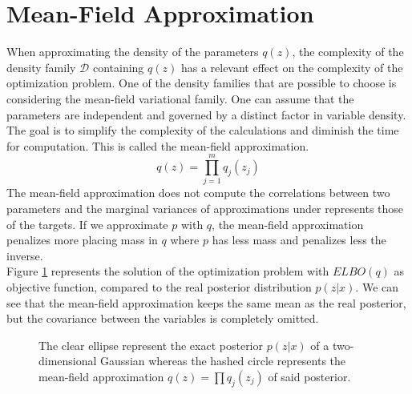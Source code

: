 \section{Mean-Field Approximation}
When approximating the density of the parameters $q(z)$, the complexity of the density family $\mathcal{D}$ containing $q(z)$ has a relevant effect on the complexity of the optimization problem. One of the density families that are possible to choose is considering the mean-field variational family. One can assume that the parameters are independent and governed by a distinct factor in variable density. The goal is to simplify the complexity of the calculations and diminish the time for computation. This is called the mean-field approximation.
\begin{equation}
q(z) = \prod_{j=1}^m q_j(z_j)
\label{eq:meanField}
\end{equation}
The mean-field approximation does not compute the correlations between two parameters and the marginal variances of approximations under represents those of the targets. If we approximate $p$ with $q$, the mean-field approximation penalizes more placing mass in $q$ where $p$ has less mass and penalizes less the inverse. \\
\newline
Figure \ref{fig:p_q_repartition} represents the solution of the optimization problem with $ELBO(q)$ as objective function, compared to the real posterior distribution $p(z|x)$. We can see that the mean-field approximation keeps the same mean as the real posterior, but the covariance between the variables is completely omitted.\\
\newline
\begin{figure}[h]
\centering


\caption{\label{fig:p_q_repartition}The clear ellipse represent the exact posterior $p(z|x)$ of a two-dimensional Gaussian whereas the hashed circle represents the mean-field approximation $q(z) = \prod q_j(z_j)$ of said posterior.}
\end{figure}

